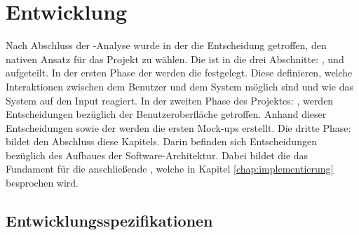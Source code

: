 \documentclass[Bachelorarbeit.tex]{subfiles}
\begin{document}
\chapter{Entwicklung}
\label{chap:entwicklung}

Nach Abschluss der -Analyse wurde in der   die Entscheidung getroffen, den nativen Ansatz für das Projekt zu wählen.
Die  ist in die drei Abschnitte: ,
 und  aufgeteilt. 
In der ersten Phase der  werden die   festgelegt. 
Diese definieren, welche Interaktionen zwischen dem Benutzer und dem System möglich sind und wie das System auf den Input reagiert. In der zweiten Phase des Projektes:  , werden Entscheidungen bezüglich der Benutzeroberfläche getroffen. 
Anhand dieser Entscheidungen sowie der werden die ersten Mock-ups erstellt.
Die dritte Phase:  bildet den Abschluss diese Kapitels. 
Darin befinden sich Entscheidungen bezüglich des Aufbaues der Software-Architektur. 
Dabei bildet die  das Fundament für die anschließende , welche in Kapitel \ref{chap:implementierung} besprochen wird.


\begin{comment}


\section{Spezifikation}

\begin{itemize} \color{red}
\item Beschreibung welche Technologien eingesetzt werden

\end{itemize}

\end{comment}

\section{Entwicklungsspezifikationen}
\label{sec:usecases}
\end{document}
